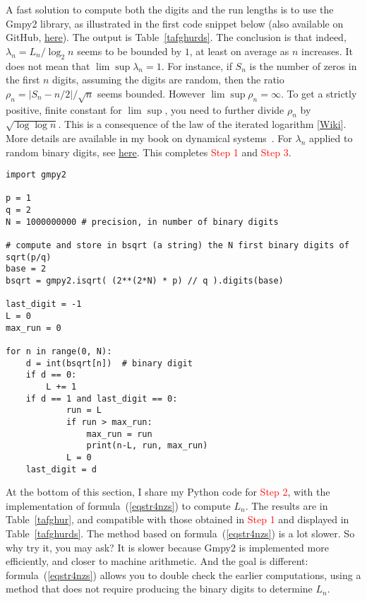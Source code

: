 \documentclass[oneside,10pt]{book}
\begin{document}
\noindent A fast solution to compute both the digits and the run lengths is to use the Gmpy2 library, as illustrated in the first code snippet below
 (also available on GitHub, \href{https://github.com/VincentGranville/Experimental-Math-Number-Theory/blob/main/Source-Code/max_runs_fast.py}{here}).
The output is Table~\ref{tafghurds}. The conclusion is that indeed, $\lambda_n = L_n / \log_2 n$ seems to be bounded by $1$, at 
least on average as $n$ increases. It does not mean that $\lim \sup \lambda_n = 1$. 
For instance, if $S_n$ is the number of zeros in the first $n$ digits, assuming the digits are random, then the ratio 
 $\rho_n = |S_n - n/2|/\sqrt{n}$ seems bounded. However $\lim \sup \rho_n = \infty$. To get a strictly positive, finite constant
 for $\lim \sup$, you need to further divide $\rho_n$ by $\sqrt{\log \log n}$. This is a consequence
 of \textcolor{index}{the law of the iterated logarithm} [\href{https://en.wikipedia.org/wiki/Law_of_the_iterated_logarithm}{Wiki}]. More details are available in my book on dynamical systems~\cite{vgchaos}.  
For $\lambda_n$ applied to random binary digits, see \href{https://math.stackexchange.com/questions/1409372/what-is-the-expected-length-of-the-largest-run-of-heads-if-we-make-1-000-flips}{here}.
This completes \textcolor{red}{Step 1} and \textcolor{red}{Step 3}.
\vspace{1ex}


\begin{lstlisting}
import gmpy2

p = 1 
q = 2 
N = 1000000000 # precision, in number of binary digits 

# compute and store in bsqrt (a string) the N first binary digits of sqrt(p/q)
base = 2
bsqrt = gmpy2.isqrt( (2**(2*N) * p) // q ).digits(base) 

last_digit = -1
L = 0
max_run = 0

for n in range(0, N):
    d = int(bsqrt[n])  # binary digit
    if d == 0:
        L += 1
    if d == 1 and last_digit == 0:
            run = L 
            if run > max_run:
                max_run = run
                print(n-L, run, max_run)
            L = 0
    last_digit = d
\end{lstlisting}

\noindent At the bottom of this section, I share my Python code for \textcolor{red}{Step 2}, with the implementation of formula~(\ref{eqstr4nzs}) to compute $L_n$. The results are in Table~\ref{tafghur}, and compatible with those obtained in \textcolor{red}{Step 1} and displayed in Table~\ref{tafghurds}. The method based on formula~(\ref{eqstr4nzs}) is a lot slower. So why try it, you may ask? It is slower because Gmpy2 
 is implemented more efficiently, and closer to machine arithmetic. And the goal is different: formula~(\ref{eqstr4nzs})  allows you to 
  double check the earlier computations, using a method that does not require producing the binary digits to determine $L_n$. 
\end{document}
